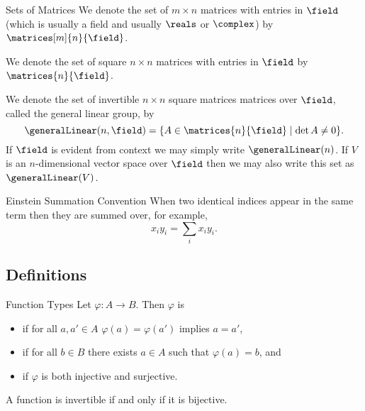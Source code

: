 \begin{ntn}{Sets of Matrices}{}
    We denote the set of \(m \times n\) matrices with entries in \(\field\) (which is usually a field and usually \(\reals\) or \(\complex\)) by \(\matrices[m]{n}{\field}\).
    
    We denote the set of square \(n \times n\) matrices with entries in \(\field\) by \(\matrices{n}{\field}\).
    
    We denote the set of invertible \(n\times n\) square matrices matrices over \(\field\), called the general linear group, by
    \begin{equation}
        \generalLinear(n, \field) = \{A \in \matrices{n}{\field} \mid \det A \ne 0\}.
    \end{equation}
    If \(\field\) is evident from context we may simply write \(\generalLinear(n)\).
    If \(V\) is an \(n\)-dimensional vector space over \(\field\) then we may also write this set as \(\generalLinear(V)\).
\end{ntn}

\begin{ntn}{Einstein Summation Convention}{}
    When two identical indices appear in the same term then they are summed over, for example,
    \begin{equation}
        x_iy_i = \sum_{i} x_iy_i.
    \end{equation} 
\end{ntn}

\subsection{Definitions}
\begin{dfn}{Function Types}{}
    Let \(\varphi \colon A \to B\).
    Then \(\varphi\) is 
    \begin{itemize}
        \item {} if for all \(a, a' \in A\) \(\varphi(a) = \varphi(a')\) implies \(a = a'\),
        \item {} if for all \(b \in B\) there exists \(a \in A\) such that \(\varphi(a) = b\), and
        \item {} if \(\varphi\) is both injective and surjective.
    \end{itemize}
    A function is invertible if and only if it is bijective.
\end{dfn}

